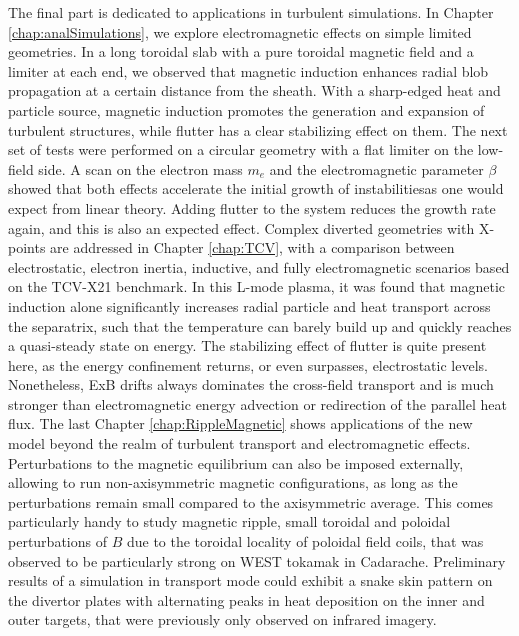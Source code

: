 The final part is dedicated to applications in turbulent simulations. In Chapter \ref{chap:analSimulations}, we explore electromagnetic effects on simple limited geometries. In a long toroidal slab with a pure toroidal magnetic field and a limiter at each end, we observed that magnetic induction enhances radial blob propagation at a certain distance from the sheath. With a sharp-edged heat and particle source, magnetic induction promotes the generation and expansion of turbulent structures, while flutter has a clear stabilizing effect on them. The next set of tests were performed on a circular geometry with a flat limiter on the low-field side. A scan on the electron mass $m_e$ and the electromagnetic parameter $\beta$ showed that both effects accelerate the initial growth of instabilitiesas one would expect from linear theory. Adding flutter to the system reduces the growth rate again, and this is also an expected effect. Complex diverted geometries with X-points are addressed in Chapter \ref{chap:TCV}, with a comparison between electrostatic, electron inertia, inductive, and fully electromagnetic scenarios based on the TCV-X21 benchmark. In this L-mode plasma, it was found that magnetic induction alone significantly increases radial particle and heat transport across the separatrix, such that the temperature can barely build up and quickly reaches a quasi-steady state on energy. The stabilizing effect of flutter is quite present here, as the energy confinement returns, or even surpasses, electrostatic levels. Nonetheless, ExB drifts always dominates the cross-field transport and is much stronger than electromagnetic energy advection or redirection of the parallel heat flux. The last Chapter \ref{chap:RippleMagnetic} shows applications of the new model beyond the realm of turbulent transport and electromagnetic effects. Perturbations to the magnetic equilibrium can also be imposed externally, allowing to run non-axisymmetric magnetic configurations, as long as the perturbations remain small compared to the axisymmetric average. This comes particularly handy to study magnetic ripple, small toroidal and poloidal perturbations of $B$ due to the toroidal locality of poloidal field coils, that was observed to be particularly strong on WEST tokamak in Cadarache. Preliminary results of a simulation in transport mode could exhibit a snake skin pattern on the divertor plates with alternating peaks in heat deposition on the inner and outer targets, that were previously only observed on infrared imagery. \\

